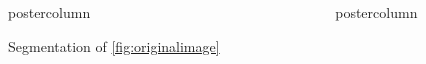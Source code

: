 \documentclass[final]{beamer}
\newlength{\columnheight}
\begin{document}
\begin{frame}
\begin{columns}
\begin{column}{.33\textwidth}
\begin{beamercolorbox}[center,wd=\textwidth]{postercolumn}
\begin{minipage}[T]{.95\textwidth}
{\begin{block}{Segmentation of \ref{fig:originalimage}}
\begin{figure}
             \end{figure}
            \end{block}
          }
        \end{minipage}
      \end{beamercolorbox}
    \end{column}

    \begin{column}{.33\textwidth}
      \begin{beamercolorbox}[center,wd=\textwidth]{postercolumn}
        \begin{minipage}[T]{.95\textwidth} %
          \parbox[t][\columnheight]{\textwidth}{ %
            
}
\end{minipage}
\end{beamercolorbox}
\end{column}
\end{columns}
\end{frame}
\end{document}
